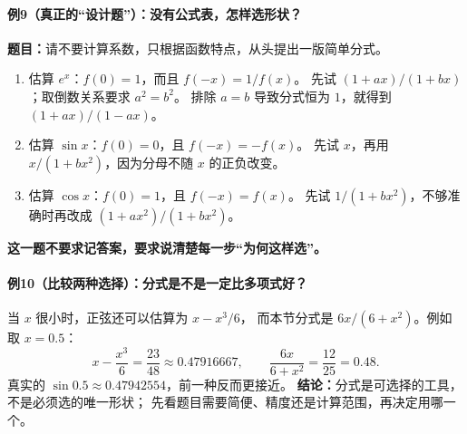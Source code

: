 \begin{examplebox}
\paragraph{例9（真正的“设计题”）：没有公式表，怎样选形状？}
\textbf{题目：}请不要计算系数，只根据函数特点，从头提出一版简单分式。
\begin{enumerate}
\item 估算 $e^x$：$f(0)=1$，而且 $f(-x)=1/f(x)$。
先试 $(1+ax)/(1+bx)$；取倒数关系要求 $a^2=b^2$。
排除 $a=b$ 导致分式恒为 $1$，就得到 $(1+ax)/(1-ax)$。
\item 估算 $\sin x$：$f(0)=0$，且 $f(-x)=-f(x)$。
先试 $x$，再用 $x/(1+bx^2)$，因为分母不随 $x$ 的正负改变。
\item 估算 $\cos x$：$f(0)=1$，且 $f(-x)=f(x)$。
先试 $1/(1+bx^2)$，不够准确时再改成 $(1+ax^2)/(1+bx^2)$。
\end{enumerate}
\textbf{这一题不要求记答案，要求说清楚每一步“为何这样选”。}

\paragraph{例10（比较两种选择）：分式是不是一定比多项式好？}
当 $x$ 很小时，正弦还可以估算为 $x-x^3/6$，
而本节分式是 $6x/(6+x^2)$。例如取 $x=0.5$：
\[
 x-\frac{x^3}{6}=\frac{23}{48}\approx0.47916667,
 \qquad\frac{6x}{6+x^2}=\frac{12}{25}=0.48.
\]
真实的 $\sin0.5\approx0.47942554$，前一种反而更接近。
\textbf{结论：}分式是可选择的工具，不是必须选的唯一形状；
先看题目需要简便、精度还是计算范围，再决定用哪一个。

\end{examplebox}
